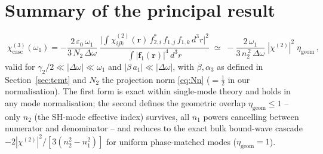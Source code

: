 \documentclass[11pt,a4paper]{article}
\newcommand{\eps}{\varepsilon}
\newcommand{\bvec}[1]{\mathbf{#1}}
\newcommand{\f}{\bvec{f}}
\newcommand{\ri}{\bvec{r}}
\newcommand{\dthreer}{\,d^{3}r}
\newcommand{\chitwo}{\chi^{(2)}}
\newcommand{\chithree}{\chi^{(3)}}
\newcommand{\Dom}{\Delta\omega}
\begin{document}
\section{Summary of the principal result}

\begin{equation}
  \boxed{\;\chithree_\text{casc}(\omega_1)
        =-\frac{2\,\eps_0\,\omega_1}{3\,N_2\,\Dom}\;
          \frac{\bigl|\!\int\!\chitwo_{ijk}(\ri)\,f_{2,i}^*\,f_{1,j}\,f_{1,k}\dthreer\bigr|^{2}}
               {\int|\f_1(\ri)|^{4}\dthreer}
        \;\simeq\;-\frac{2\,\omega_1}{3\,n_2^{\,2}\,\Dom}\;|\chitwo|^{2}\;\eta_\text{geom}\,,\;}
\end{equation}
valid for $\gamma_2/2\ll|\Dom|\ll\omega_1$ and $|\beta\,a_1|\ll|\Dom|$,
with $\beta,\alpha_3$ as defined in Section~\ref{sec:tcmt} and $N_2$ the
projection norm \eqref{eq:Nn} ($=\tfrac12$ in our normalisation).  The
first form is exact within single-mode theory and holds in any mode
normalisation; the second defines the geometric overlap
$\eta_\text{geom}\le1$ -- only $n_2$ (the SH-mode effective index)
survives, all $n_1$ powers cancelling between numerator and
denominator -- and reduces to the exact bulk bound-wave cascade
$-2|\chitwo|^2/[3(n_2^2-n_1^2)]$ for uniform phase-matched modes
($\eta_\text{geom}=1$).
\end{document}

